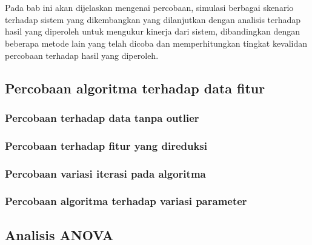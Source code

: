 \chapter{\babLima}
Pada bab ini akan dijelaskan mengenai percobaan, simulasi berbagai skenario
terhadap sistem yang dikembangkan yang dilanjutkan dengan analisis terhadap
hasil yang diperoleh untuk mengukur kinerja dari sistem, dibandingkan dengan
beberapa metode lain yang telah dicoba dan memperhitungkan tingkat kevalidan
percobaan terhadap hasil yang diperoleh.

\section{Percobaan algoritma terhadap data fitur}

\subsection{Percobaan terhadap data tanpa outlier}

\subsection{Percobaan terhadap fitur yang direduksi}

\subsection{Percobaan variasi iterasi pada algoritma}

\subsection{Percobaan algoritma terhadap variasi parameter}

\section{Analisis ANOVA}

